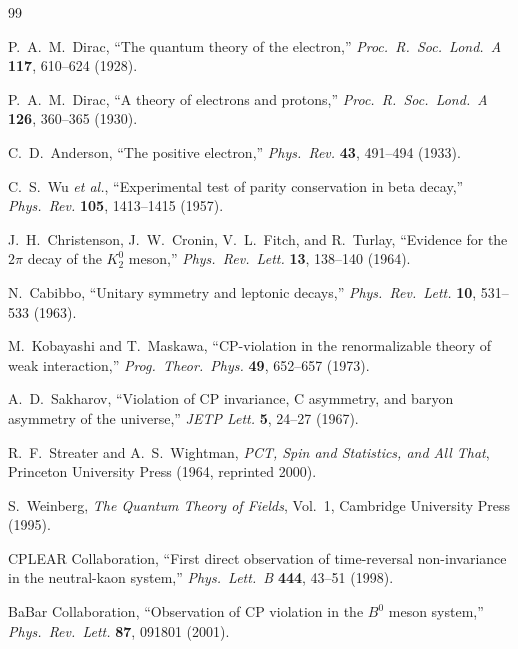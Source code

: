 \documentclass[12pt]{article}
\theoremstyle{definition}
\theoremstyle{remark}
\begin{document}
\begin{thebibliography}{99}

P.~A.~M.~Dirac, ``The quantum theory of the electron,''
\textit{Proc.\ R.\ Soc.\ Lond.\ A} \textbf{117}, 610--624 (1928).

P.~A.~M.~Dirac, ``A theory of electrons and protons,''
\textit{Proc.\ R.\ Soc.\ Lond.\ A} \textbf{126}, 360--365 (1930).

C.~D.~Anderson, ``The positive electron,''
\textit{Phys.\ Rev.} \textbf{43}, 491--494 (1933).

C.~S.~Wu \textit{et al.}, ``Experimental test of parity conservation in beta decay,''
\textit{Phys.\ Rev.} \textbf{105}, 1413--1415 (1957).

J.~H.~Christenson, J.~W.~Cronin, V.~L.~Fitch, and R.~Turlay,
``Evidence for the $2\pi$ decay of the $K_2^0$ meson,''
\textit{Phys.\ Rev.\ Lett.} \textbf{13}, 138--140 (1964).

N.~Cabibbo, ``Unitary symmetry and leptonic decays,''
\textit{Phys.\ Rev.\ Lett.} \textbf{10}, 531--533 (1963).

M.~Kobayashi and T.~Maskawa, ``CP-violation in the renormalizable theory of weak interaction,''
\textit{Prog.\ Theor.\ Phys.} \textbf{49}, 652--657 (1973).

A.~D.~Sakharov, ``Violation of CP invariance, C asymmetry, and baryon asymmetry of the universe,''
\textit{JETP Lett.} \textbf{5}, 24--27 (1967).

R.~F.~Streater and A.~S.~Wightman,
\textit{PCT, Spin and Statistics, and All That},
Princeton University Press (1964, reprinted 2000).

S.~Weinberg, \textit{The Quantum Theory of Fields}, Vol.~1,
Cambridge University Press (1995).

CPLEAR Collaboration, ``First direct observation of time-reversal non-invariance
in the neutral-kaon system,''
\textit{Phys.\ Lett.\ B} \textbf{444}, 43--51 (1998).

BaBar Collaboration, ``Observation of CP violation in the $B^0$ meson system,''
\textit{Phys.\ Rev.\ Lett.} \textbf{87}, 091801 (2001).


\end{thebibliography}
\end{document}
